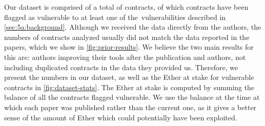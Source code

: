 Our dataset is comprised of a total of  contracts, of which \VulnerableContracts contracts have been flagged as vulnerable to at least one of the~\VulnTypes vulnerabilities described in \autoref{sec:5a:background}. Although we received the data directly from the authors, the numbers of contracts analyzed usually did not match the data reported in the papers, which we show in \autoref{fig:prior-results}.
We believe the two main results for this are: authors improving their tools after the publication and authors, not including duplicated contracts in the data they provided us. Therefore, we present the numbers in our dataset, as well as the Ether at stake for vulnerable contracts in \autoref{fig:dataset-stats}. The Ether at stake is computed by summing the balance of all the contracts flagged vulnerable. We use the balance at the time at which each paper was published rather than the current one, as it gives a better sense of the amount of Ether which could potentially have been exploited.

